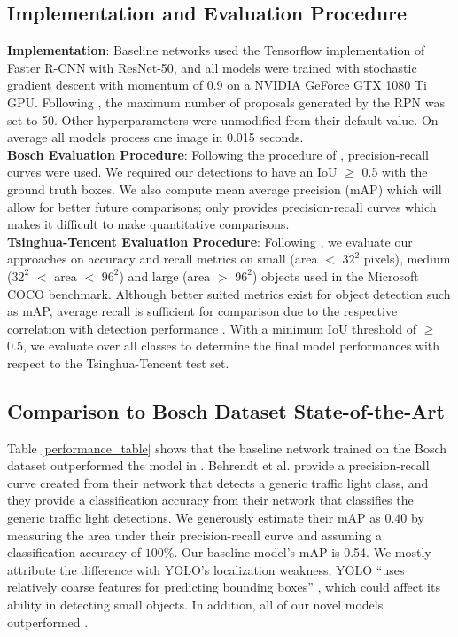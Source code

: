 \documentclass[10pt, conference, compsocconf]{IEEEtran}
\begin{document}
\subsection{Implementation and Evaluation Procedure}

\noindent\textbf{Implementation}:  Baseline networks used the Tensorflow \cite{abadi2016} implementation of Faster R-CNN with ResNet-50, and all models were trained with stochastic gradient descent with momentum of 0.9 on a NVIDIA GeForce GTX 1080 Ti GPU. Following \cite{huang2016}, the maximum number of proposals generated by the RPN was set to 50. Other hyperparameters were unmodified from their default value. On average all models process one image in 0.015 seconds. \\

\noindent\textbf{Bosch Evaluation Procedure}: Following the procedure of \cite{behrendt2017}, precision-recall curves were used. We required our detections to have an IoU $\geq$ 0.5 with the ground truth boxes. We also compute mean average precision (mAP) which will allow for better future comparisons; \cite{behrendt2017} only provides precision-recall curves which makes it difficult to make quantitative comparisons. \\

\noindent\textbf{Tsinghua-Tencent Evaluation Procedure}: Following \cite{tencent}, we evaluate our approaches on accuracy and recall metrics on small (area $<$ $32^2$ pixels), medium ($32^2$ $<$ area $<$ $96^2$) and large (area $>$ $96^2$) objects used in the Microsoft COCO benchmark. Although better suited metrics exist for object detection such as mAP, average recall is sufficient for comparison due to the respective correlation with detection performance \cite{effective_detections}. With a minimum IoU threshold of $\geq$ 0.5, we evaluate over all classes to determine the final model performances with respect to the Tsinghua-Tencent test set. \\

\subsection{Comparison to Bosch Dataset State-of-the-Art}

Table \ref{performance_table} shows that the baseline network trained on the Bosch dataset outperformed the model in \cite{behrendt2017}. Behrendt et al. \cite{behrendt2017} provide a precision-recall curve created from their network that detects a generic traffic light class, and they provide a classification accuracy from their network that classifies the generic traffic light detections. We generously estimate their mAP as $0.40$ by measuring the area under their precision-recall curve and assuming a classification accuracy of $100\%$.  Our baseline model's mAP is 0.54. We mostly attribute the difference with YOLO's localization weakness; YOLO ``uses relatively coarse features for predicting bounding boxes'' \cite{redmon2015}, which could affect its ability in detecting small objects. In addition, all of our novel models outperformed \cite{behrendt2017}.
\end{document}
